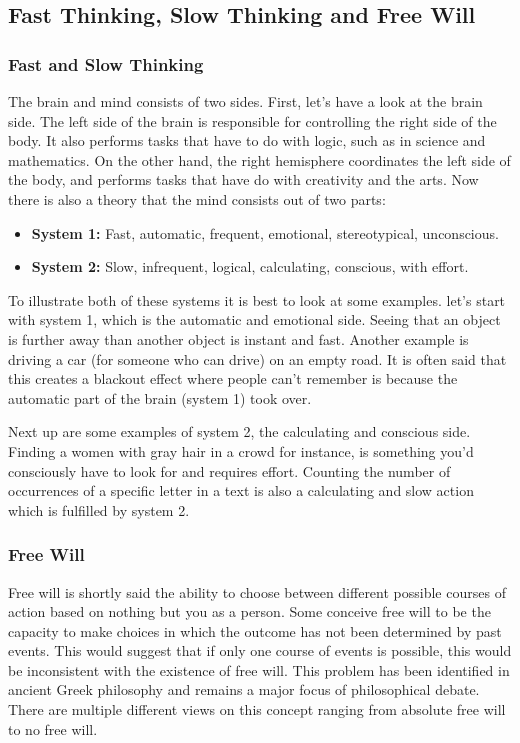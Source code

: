 \documentclass{article}
\begin{document}
\subsection{Fast Thinking, Slow Thinking and Free Will}
\subsubsection{Fast and Slow Thinking}
The brain and mind consists of two sides. First, let's have a look at the brain side. The left side of the brain is responsible for controlling the right side of the body. It also performs tasks that have to do with logic, such as in science and mathematics. On the other hand, the right hemisphere coordinates the left side of the body, and performs tasks that have do with creativity and the arts. Now there is also a theory that the mind consists out of two parts:
\begin{itemize}
    \item \textbf{System 1:} Fast, automatic, frequent, emotional, stereotypical, unconscious.
    \item \textbf{System 2:} Slow, infrequent, logical, calculating, conscious, with effort.
\end{itemize}
To illustrate both of these systems it is best to look at some examples. let's start with system 1, which is the automatic and emotional side. Seeing that an object is further away than another object is instant and fast. Another example is driving a car (for someone who can drive) on an empty road. It is often said that this creates a blackout effect where people can't remember is because the automatic part of the brain (system 1) took over.

Next up are some examples of system 2, the calculating and conscious side. Finding a women with gray hair in a crowd for instance, is something you'd consciously have to look for and requires effort. Counting the number of occurrences of a specific letter in a text is also a calculating and slow action which is fulfilled by system 2.
\subsubsection{Free Will}
Free will is shortly said the ability to choose between different possible courses of action based on nothing but you as a person. Some conceive free will to be the capacity to make choices in which the outcome has not been determined by past events. This would suggest that if only one course of events is possible, this would be inconsistent with the existence of free will. This problem has been identified in ancient Greek philosophy and remains a major focus of philosophical debate. There are multiple different views on this concept ranging from absolute free will to no free will.
\end{document}
